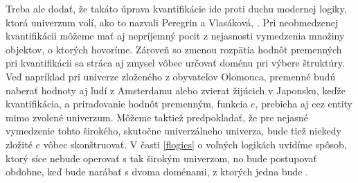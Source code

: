 \documentclass[12pt, letterpaper]{article}
\begin{document}
Treba ale dodať, že takáto úprava kvantifikácie ide proti duchu modernej logiky, ktorá univerzum volí, ako to nazvali Peregrin a Vlasáková,  \parencites[96]{peregrin_filosofie_2017}. Pri neobmedzenej kvantifikácii môžeme mať aj nepríjemný pocit z nejasnosti vymedzenia množiny objektov, o ktorých hovoríme. Zároveň so zmenou rozpätia hodnôt premenných pri kvantifikácii sa stráca aj zmysel vôbec určovať doménu pri výbere štruktúry. Veď napríklad pri univerze zloženého z obyvateľov Olomouca, premenné budú naberať hodnoty aj ľudí z Amsterdamu alebo zvierat žijúcich v Japonsku, keďže kvantifikácia, a priraďovanie hodnôt premenným, funkcia $e$, prebieha aj cez entity mimo zvolené univerzum. Môžeme taktiež predpokladať, že pre nejasné vymedzenie tohto širokého, skutočne univerzálneho univerza, bude tiež niekedy zložité $e$ vôbec skonštruovať. V časti \ref{flogics} o voľných logikách uvidíme spôsob, ktorý síce nebude operovať s tak širokým univerzom, no bude postupovať obdobne, keď bude narábať s dvoma doménami, z ktorých jedna bude .\par
\end{document}
